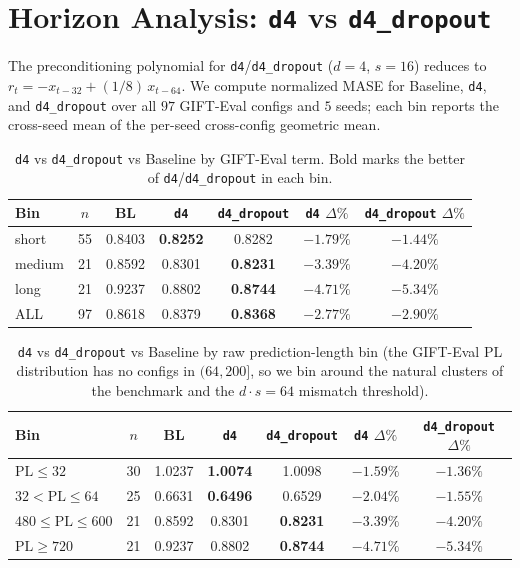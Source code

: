 \documentclass{article}
\begin{document}
\section{Horizon Analysis: \texttt{d4} vs \texttt{d4\_dropout}}
\label{app:horizon}

The preconditioning polynomial for \texttt{d4}/\texttt{d4\_dropout} ($d{=}4$, $s{=}16$) reduces to $r_t = -x_{t-32} + (1/8)\, x_{t-64}$. We compute normalized MASE for Baseline, \texttt{d4}, and \texttt{d4\_dropout} over all $97$ GIFT-Eval configs and $5$ seeds; each bin reports the cross-seed mean of the per-seed cross-config geometric mean.

\begin{table}[H]
\centering
\caption{\texttt{d4} vs \texttt{d4\_dropout} vs Baseline by GIFT-Eval term. Bold marks the better of \texttt{d4}/\texttt{d4\_dropout} in each bin.}
\small
\begin{tabular}{lcccccc}
\toprule
\textbf{Bin} & \textbf{$n$} & \textbf{BL} & \textbf{\texttt{d4}} & \textbf{\texttt{d4\_dropout}} & \textbf{\texttt{d4} $\Delta\%$} & \textbf{\texttt{d4\_dropout} $\Delta\%$} \\
\midrule
short  & 55 & 0.8403 & \textbf{0.8252} & 0.8282 & $-1.79\%$ & $-1.44\%$ \\
medium & 21 & 0.8592 & 0.8301 & \textbf{0.8231} & $-3.39\%$ & $-4.20\%$ \\
long   & 21 & 0.9237 & 0.8802 & \textbf{0.8744} & $-4.71\%$ & $-5.34\%$ \\
\midrule
ALL    & 97 & 0.8618 & 0.8379 & \textbf{0.8368} & $-2.77\%$ & $-2.90\%$ \\
\bottomrule
\end{tabular}
\end{table}

\begin{table}[H]
\centering
\caption{\texttt{d4} vs \texttt{d4\_dropout} vs Baseline by raw prediction-length bin (the GIFT-Eval PL distribution has no configs in $(64, 200]$, so we bin around the natural clusters of the benchmark and the $d\cdot s = 64$ mismatch threshold).}
\small
\begin{tabular}{lcccccc}
\toprule
\textbf{Bin} & \textbf{$n$} & \textbf{BL} & \textbf{\texttt{d4}} & \textbf{\texttt{d4\_dropout}} & \textbf{\texttt{d4} $\Delta\%$} & \textbf{\texttt{d4\_dropout} $\Delta\%$} \\
\midrule
$\text{PL} \le 32$       & 30 & 1.0237 & \textbf{1.0074} & 1.0098 & $-1.59\%$ & $-1.36\%$ \\
$32 < \text{PL} \le 64$  & 25 & 0.6631 & \textbf{0.6496} & 0.6529 & $-2.04\%$ & $-1.55\%$ \\
$480 \le \text{PL} \le 600$ & 21 & 0.8592 & 0.8301 & \textbf{0.8231} & $-3.39\%$ & $-4.20\%$ \\
$\text{PL} \ge 720$      & 21 & 0.9237 & 0.8802 & \textbf{0.8744} & $-4.71\%$ & $-5.34\%$ \\
\bottomrule
\end{tabular}
\end{table}
\end{document}
